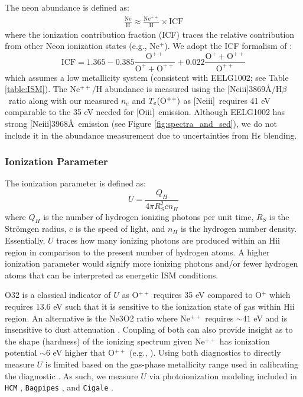 \documentclass[twocolumn,tight,times,linenumbers]{aastex631}
\newcommand{\hbeta}{H$\beta$}
\newcommand{\oiii}{[O{\sc iii}]}
\newcommand{\neiii}{[Ne{\sc iii}]}
\begin{document}
		The neon abundance is defined as:
			\begin{eqnarray}
				\frac{\textrm{Ne}}{\textrm{H}} \approx \frac{\textrm{Ne}^{++}}{\textrm{H}} \times \textrm{ICF}
			\end{eqnarray}	
		where the ionization contribution fraction (ICF) traces the relative contribution from other Neon ionization states (e.g., Ne$^+$). We adopt the ICF formalism of \citet{Izotov2006}: 
		\begin{equation}
				\textrm{ICF} = 1.365 -0.385\frac{\textrm{O}^{++}}{\textrm{O}^{+} + \textrm{O}^{++}} + 0.022\frac{\textrm{O}^{+} + \textrm{O}^{++}}{\textrm{O}^{++}}
		\end{equation}		
		which assumes a low metallicity system (consistent with EELG1002; see Table \ref{table:ISM}). The Ne$^{++}$/H abundance is measured using the \neiii3869\AA/\hbeta~ratio along with our measured $n_e$ and $T_e(\rm{O}^{++})$ as \neiii~requires 41 eV comparable to the 35 eV needed for \oiii~emission. Although EELG1002 has strong \neiii3968\AA~emission (see Figure \ref{fig:spectra_and_sed}), we do not include it in the abundance measurement due to uncertainties from H$\epsilon$ blending. %


		\subsubsection{Ionization Parameter}
		
		The ionization parameter is defined as:
		\begin{equation}
			U = \frac{Q_{H}}{4 \pi  R_S^2 c n_H}
			\label{eqn:logU}
		\end{equation}
		where $Q_H$ is the number of hydrogen ionizing photons per unit time, $R_S$ is the Str\"{o}mgen radius, $c$ is the speed of light, and $n_H$ is the hydrogen number density. Essentially, $U$ traces how many ionizing photons are produced within an H{\sc ii} region in comparison to the present number of hydrogen atoms. A higher ionization parameter would signify more ionizing photons and/or fewer hydrogen atoms that can be interpreted as energetic ISM conditions.
		
		O32 is a classical indicator of $U$ as O$^{++}$ requires 35 eV compared to O$^{+}$ which requires 13.6 eV such that it is sensitive to the ionization state of gas within H{\sc ii} region. An alternative is the Ne3O2 ratio where Ne$^{++}$ requires $\sim 41$ eV and is insensitive to dust attenuation \citep{Levesque2014}. Coupling of both can also provide insight as to the shape (hardness) of the ionizing spectrum given Ne$^{++}$ has ionization potential $\sim 6$ eV higher that O$^{++}$ (e.g., \citealt{Strom2017,Jeong2020}). Using both diagnostics to directly measure $U$ is limited based on the gas-phase metallicity range used in calibrating the diagnostic \citep{Kewley2019}. As such, we measure $U$ via photoionization modeling included in \texttt{HCM} \citep{PerezMontero2014}, \texttt{Bagpipes} \citep{Carnall2018}, and \texttt{Cigale} \citep{Boquien2019}.
			
\end{document}
